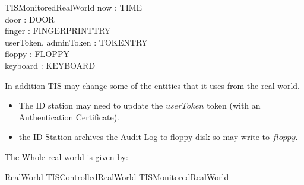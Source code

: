 \begin{schema}{TISMonitoredRealWorld}
        now : TIME
\\      door : DOOR
\\      finger : FINGERPRINTTRY
\\      userToken, adminToken : TOKENTRY
\\      floppy : FLOPPY
\\      keyboard : KEYBOARD
\end{schema}

In addition TIS may change some of the entities that it uses from the
real world.   
\begin{itemize}
\item The ID station may need to update the $userToken$ token
(with an Authentication Certificate).
\item the ID Station archives the Audit Log to floppy disk so may
write to $floppy$.
\end{itemize}

The Whole real world is given by:
\begin{zed}
RealWorld  TISControlledRealWorld \land TISMonitoredRealWorld
\end{zed}
